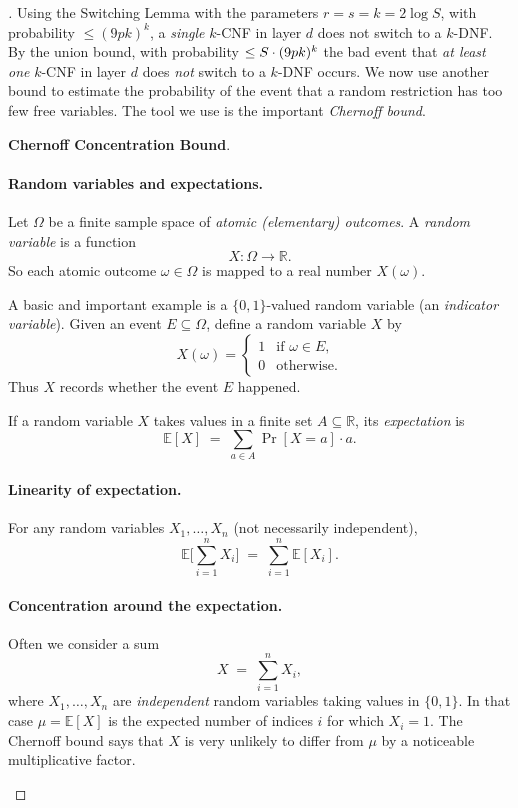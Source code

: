 \begin{proof}[]
Using the Switching Lemma with the parameters \( r = s = k = 2 \log S \), with probability \( \leq (9pk)^k \), a \emph{single} $k$-CNF in layer \( d \) does not switch to a $k$-DNF.
By the union bound, with probability \( \leq S\cdot(9pk)^k \) the bad event that \emph{at least one} $k$-CNF in layer \( d \) does \emph{not} switch to a $k$-DNF occurs.
We now use another bound to estimate the probability of the event that a random restriction has too few free variables. The tool we use is the important \emph{Chernoff bound}.


\begin{tcolorbox}[colframe=white, colback=gray!11, boxrule=0mm, sharp corners]
\textbf{Chernoff Concentration Bound}.
 
\paragraph{Random variables and expectations.}
Let $\Omega$ be a finite sample space of \emph{atomic (elementary) outcomes}. A \emph{random variable} is a function
\[
X:\Omega \to \mathbb{R}.
\]
So each atomic outcome $\omega\in\Omega$ is mapped to a real number $X(\omega)$.

A basic and important example is a $\{0,1\}$-valued random variable (an \emph{indicator variable}). Given an event $E \subseteq \Omega$, define a random variable $X$ by
\[
X(\omega)=
\begin{cases}
1 & \text{if } \omega\in E,\\
0 & \text{otherwise.}
\end{cases}
\]
Thus $X$ records whether the event $E$ happened.

If a random variable $X$ takes values in a finite set $A\subseteq\mathbb{R}$, its \emph{expectation} is
\[
\mathbb{E}[X] \;=\; \sum_{a\in A}\Pr[X=a]\cdot a.
\]

\paragraph{Linearity of expectation.}
For any random variables $X_1,\dots,X_n$ (not necessarily independent),
\[
\mathbb{E}\Big[\sum_{i=1}^n X_i\Big] \;=\; \sum_{i=1}^n \mathbb{E}[X_i].
\]

\paragraph{Concentration around the expectation.}
Often we consider a sum
\[
X \;=\; \sum_{i=1}^n X_i,
\]
where $X_1,\dots,X_n$ are \emph{independent} random variables taking values in $\{0,1\}$. In that case $\mu=\mathbb{E}[X]$ is the expected number of indices $i$ for which $X_i=1$. The Chernoff bound says that $X$ is very unlikely to differ from $\mu$ by a noticeable multiplicative factor.


\end{tcolorbox}
\end{proof}
